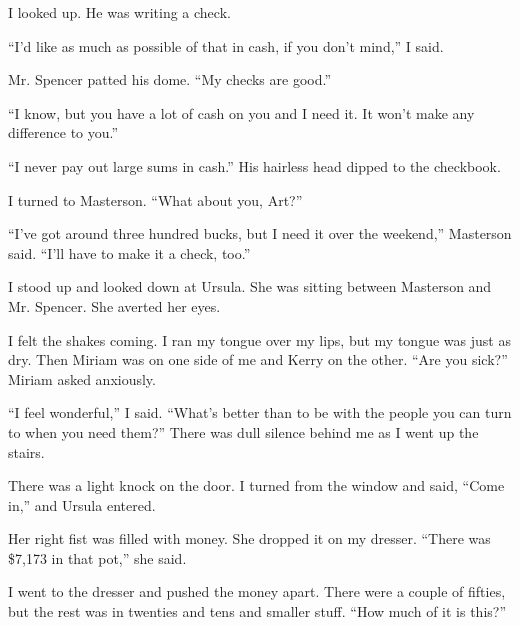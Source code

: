 \documentclass{novel}
\begin{document}
I looked up. He was writing a check.

“I’d like as much as possible of that in cash, if you don’t mind,” I said.

Mr. Spencer patted his dome. “My checks are good.”

“I know, but you have a lot of cash on you and I need it. It won’t make any difference to you.”

“I never pay out large sums in cash.” His hairless head dipped to the checkbook.

I turned to Masterson. “What about you, Art?”

“I’ve got around three hundred bucks, but I need it over the weekend,” Masterson said. “I’ll have to make it a check, too.”

I stood up and looked down at Ursula. She was sitting between Masterson and Mr. Spencer. She averted her eyes.

I felt the shakes coming. I ran my tongue over my lips, but my tongue was just as dry. Then Miriam was on one side of me and Kerry on the other. “Are you sick?” Miriam asked anxiously.

“I feel wonderful,” I said. “What’s better than to be with the people you can turn to when you need them?” There was dull silence behind me as I went up the stairs.

\vspace{2\nbs}
\clearpage
\thispagestyle{empty}


\begin{ChapterStart}
\vspace{3\nbs}
\end{ChapterStart}

There was a light knock on the door. I turned from the window and said, “Come in,” and Ursula entered.

Her right fist was filled with money. She dropped it on my dresser. “There was \$7,173 in that pot,” she said.

I went to the dresser and pushed the money apart. There were a couple of fifties, but the rest was in twenties and tens and smaller stuff. “How much of it is this?”
\end{document}
